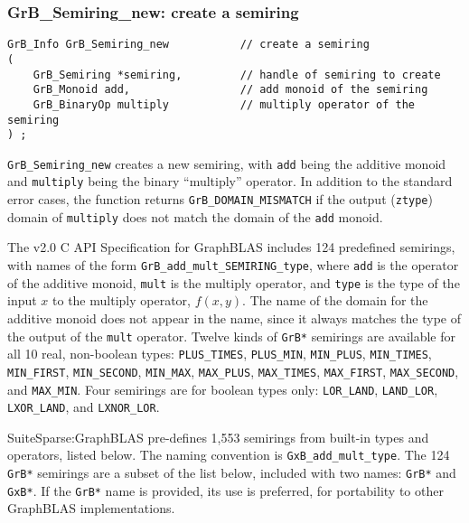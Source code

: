 \documentclass[12pt]{article}
\begin{document}
\subsubsection{{\sf GrB\_Semiring\_new:} create a semiring}
\label{semiring_new}

\begin{mdframed}[userdefinedwidth=6in]
{\footnotesize
\begin{verbatim}
GrB_Info GrB_Semiring_new           // create a semiring
(
    GrB_Semiring *semiring,         // handle of semiring to create
    GrB_Monoid add,                 // add monoid of the semiring
    GrB_BinaryOp multiply           // multiply operator of the semiring
) ;
\end{verbatim}
} \end{mdframed}

\verb'GrB_Semiring_new' creates a new semiring, with \verb'add' being the
additive monoid and \verb'multiply' being the binary ``multiply'' operator.  In
addition to the standard error cases, the function returns
\verb'GrB_DOMAIN_MISMATCH' if the output (\verb'ztype') domain of
\verb'multiply' does not match the domain of the \verb'add' monoid.

The v2.0 C API Specification for GraphBLAS includes 124 predefined semirings,
with names of the form \verb'GrB_add_mult_SEMIRING_type', where \verb'add' is
the operator of the additive monoid, \verb'mult' is the multiply operator, and
\verb'type' is the type of the input $x$ to the multiply operator, $f(x,y)$.
The name of the domain for the additive monoid does not appear in the name,
since it always matches the type of the output of the \verb'mult' operator.
Twelve kinds of \verb'GrB*' semirings are available for all 10 real, non-boolean types:
    \verb'PLUS_TIMES', \verb'PLUS_MIN',
    \verb'MIN_PLUS', \verb'MIN_TIMES', \verb'MIN_FIRST', \verb'MIN_SECOND', \verb'MIN_MAX',
    \verb'MAX_PLUS', \verb'MAX_TIMES', \verb'MAX_FIRST', \verb'MAX_SECOND', and \verb'MAX_MIN'.
Four semirings are for boolean types only:
    \verb'LOR_LAND', \verb'LAND_LOR', \verb'LXOR_LAND', and \verb'LXNOR_LOR'.

SuiteSparse:GraphBLAS pre-defines 1,553 semirings from built-in types and
operators, listed below.  The naming convention is \verb'GxB_add_mult_type'.
The 124 \verb'GrB*' semirings are a subset of the list below, included with two
names: \verb'GrB*' and \verb'GxB*'.  If the \verb'GrB*' name is provided, its
use is preferred, for portability to other GraphBLAS implementations.
\end{document}
